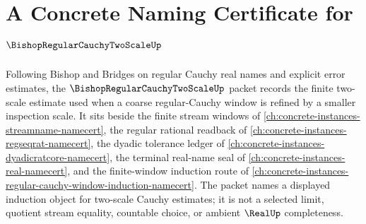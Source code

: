 \chapter{A Concrete Naming Certificate for $\BishopRegularCauchyTwoScaleUp$}
\label{ch:concrete-instances-bishop-regular-cauchy-two-scale-namecert}

Following Bishop and Bridges on regular Cauchy real names and explicit error estimates, the $\BishopRegularCauchyTwoScaleUp$ packet records the finite two-scale estimate used when a coarse regular-Cauchy window is refined by a smaller inspection scale. It sits beside the finite stream windows of \autoref{ch:concrete-instances-streamname-namecert}, the regular rational readback of \autoref{ch:concrete-instances-regseqrat-namecert}, the dyadic tolerance ledger of \autoref{ch:concrete-instances-dyadicratcore-namecert}, the terminal real-name seal of \autoref{ch:concrete-instances-real-namecert}, and the finite-window induction route of \autoref{ch:concrete-instances-regular-cauchy-window-induction-namecert}. The packet names a displayed induction object for two-scale Cauchy estimates; it is not a selected limit, quotient stream equality, countable choice, or ambient $\RealUp$ completeness.

